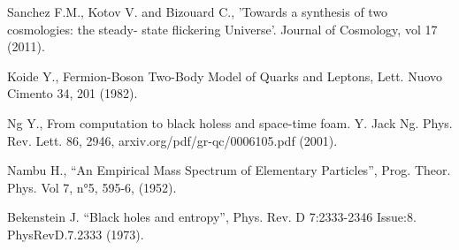 \documentclass[a4paper,9pt]{article}
\begin{document}
\begin{thebibliography}{99}



 Sanchez F.M., Kotov V. and Bizouard C., 'Towards a synthesis of two cosmologies: the steady- state flickering Universe'. Journal of Cosmology, vol 17 (2011).









 Koide Y., Fermion-Boson Two-Body Model of Quarks and Leptons, Lett. Nuovo Cimento 34, 201 (1982).

 Ng Y., From computation to black holess and space-time foam. Y. Jack Ng. Phys. Rev. Lett. 86, 2946, arxiv.org/pdf/gr-qc/0006105.pdf (2001).

 Nambu H., “An Empirical Mass Spectrum of Elementary Particles”, Prog. Theor. Phys. Vol 7, n°5, 595-6, (1952).








 Bekenstein J. ``Black holes and entropy'', Phys. Rev. D 7:2333-2346 Issue:8. PhysRevD.7.2333 (1973).













\end{thebibliography}
\end{document}
